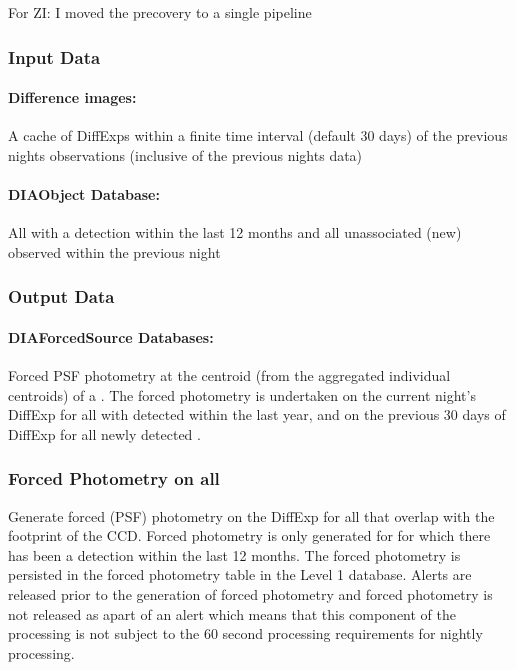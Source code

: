 \begin{note}{For ZI: I moved the precovery to a single pipeline}\end{note}
\subsubsection{Input Data}

\paragraph*{Difference images:} A cache of DiffExps within a finite time interval (default 30 days) of the previous nights observations (inclusive of the previous nights data)

\paragraph*{DIAObject Database:} All \DIAObjects with a \DIASource detection within the last 12 months and all unassociated (new) \DIAObjects observed within the previous night


\subsubsection{Output Data}

\paragraph*{DIAForcedSource Databases:} Forced PSF photometry at the centroid (from the aggregated individual \DIASource centroids) of a \DIAObject. The forced photometry is undertaken on the current night's DiffExp for all \DIAObjects with \DIASources detected within the last year, and on the previous 30 days of DiffExp for all newly detected \DIASources.


\subsubsection{Forced Photometry on all \DIAObjects}

Generate forced (PSF) photometry on the DiffExp for all \DIAObjects that overlap with the footprint of the CCD. Forced photometry is only generated for \DIAObjects for which there has been a \DIASource detection within the last 12 months. The forced photometry is persisted in the forced photometry table in the Level 1 database. Alerts are released prior to the generation of forced photometry and forced photometry is not released as apart of an alert which means that this component of the processing is not subject to the 60 second processing requirements for nightly processing.

